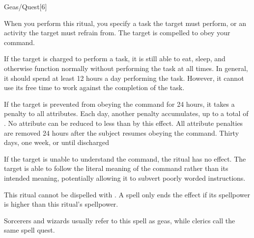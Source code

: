 \begin{spellsection}{Geas/Quest}[6]
    \begin{spellheader}
    \end{spellheader}
    \begin{spellcontent}
        \begin{spelltargetinginfo}
            \spellrng{\rngmed}
        \end{spelltargetinginfo}
        \begin{spelleffects}

            \spelleffect When you perform this ritual, you specify a task the target must perform, or an activity the target must refrain from. The target is compelled to obey your command.

            If the target is charged to perform a task, it is still able to eat, sleep, and otherwise function normally without performing the task at all times. In general, it should spend at least 12 hours a day performing the task. However, it cannot use its free time to work against the completion of the task.

            \par If the target is prevented from obeying the command for 24 hours, it takes a  penalty to all attributes. Each day, another  penalty accumulates, up to a total of . No attribute can be reduced to less than  by this effect. All attribute penalties are removed 24 hours after the subject resumes obeying the command.
            \spelldur Thirty days, one week, or until discharged \dismissable
        \end{spelleffects}
    \end{spellcontent}
    \begin{spellfooter}
        \spellnotes If the target is unable to understand the command, the ritual has no effect. The target is able to follow the literal meaning of the command rather than its intended meaning, potentially allowing it to subvert poorly worded instructions.

        \par This ritual cannot be dispelled with . A  spell only ends the effect if its spellpower is higher than this ritual's spellpower.

        \par Sorcerers and wizards usually refer to this spell as geas, while clerics call the same spell quest.
    \end{spellfooter}
\end{spellsection}

